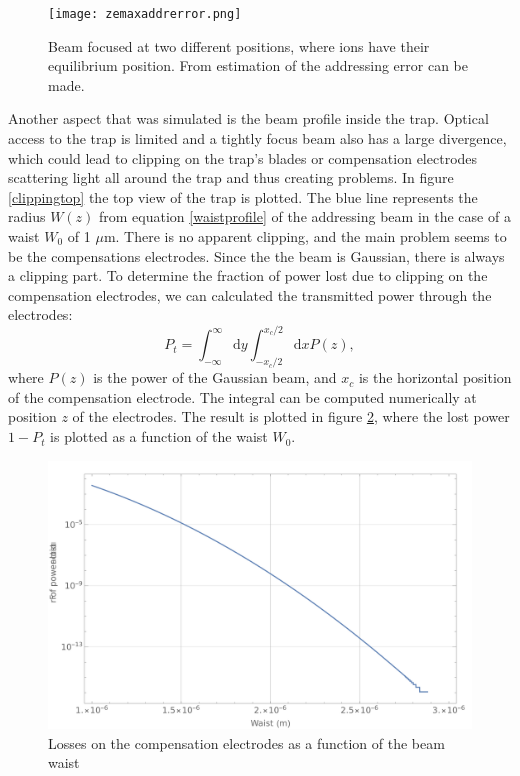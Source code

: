  \begin{figure}
 \centering
 \texttt{[image: zemaxaddrerror.png]}
 \caption{Beam focused at two different positions, where ions have their equilibrium position. From estimation of the addressing error can be made.}
 \label{zemaxaddrerror.png}
 \end{figure}
Another aspect that was simulated is the beam profile inside the trap. Optical access to the trap is limited and a tightly focus beam also has a large divergence, which could lead to clipping on the trap's blades or compensation electrodes scattering light all around the trap and thus creating problems. In figure \ref{clippingtop} the top view of the trap is plotted. The blue line represents the radius $W(z)$ from equation \ref{waistprofile} of the addressing beam in the case of a waist $W_0$ of 1 $\mu$m. There is no apparent clipping, and the main problem seems to be the compensations electrodes. Since the the beam is Gaussian, there is always a clipping part. To determine the fraction of power lost due to clipping on the compensation electrodes, we can calculated the transmitted power through the electrodes:
\begin{equation}
P_{t} = \int_{-\infty}^{\infty}\text{d}y \int_{-x_c/2}^{x_c/2}\text{d}x P(z),
\end{equation}
where $P(z)$ is the power of the Gaussian beam, and $x_c$ is the horizontal position of the compensation electrode. The integral can be computed numerically at position $z$ of the electrodes. The result is plotted in figure \ref{lossesplot}, where the lost power $1-P_{t}$ is plotted as a function of the waist $W_0$.
\begin{figure}
      \centering
        \includegraphics[width=.8\textwidth]{img/clipping2}
        \caption{Losses on the compensation electrodes as a function of the beam waist}
        \label{lossesplot}

\end{figure}

